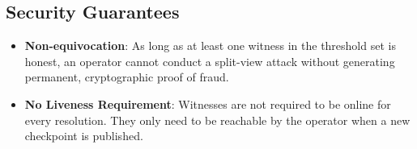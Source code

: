\documentclass[
]{article}
\providecommand{\tightlist}{%
  \setlength{\itemsep}{0pt}\setlength{\parskip}{0pt}}
\begin{document}
\hypertarget{security-guarantees}{%
\subsection{Security Guarantees}\label{security-guarantees}}

\begin{itemize}
\tightlist
\item
  \textbf{Non-equivocation}: As long as at least one witness in the
  threshold set is honest, an operator cannot conduct a split-view
  attack without generating permanent, cryptographic proof of fraud.
\item
  \textbf{No Liveness Requirement}: Witnesses are not required to be
  online for every resolution. They only need to be reachable by the
  operator when a new checkpoint is published.
\end{itemize}
\end{document}

